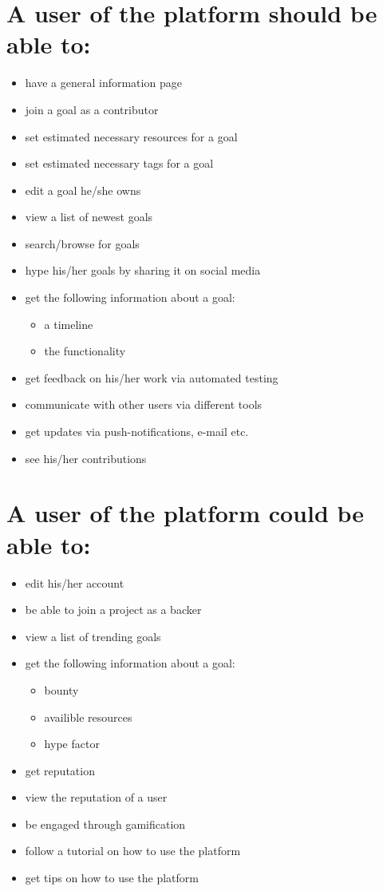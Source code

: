 \section*{A user of the platform should be able to:}
\begin{itemize}[nosep]
    \item have a general information page
    \item join a goal as a contributor
    \item set estimated necessary resources for a goal
    \item set estimated necessary tags for a goal
    \item edit a goal he/she owns
    \item view a list of newest goals
    \item search/browse for goals
    \item hype his/her goals by sharing it on social media
    \item get the following information about a goal:
        \begin{itemize}
            \item a timeline
            \item the functionality
        \end{itemize}
    \item get feedback on his/her work via automated testing
    \item communicate with other users via different tools 
    \item get updates via push-notifications, e-mail etc.
    \item see his/her contributions
\end{itemize}
\section*{A user of the platform could be able to:}
\begin{itemize}[nosep]
    \item edit his/her account
    \item be able to join a project as a backer
    \item view a list of trending goals
    \item get the following information about a goal:
        \begin{itemize}
            \item bounty
            \item availible resources
            \item hype factor
        \end{itemize}
    \item get reputation
    \item view the reputation of a user
    \item be engaged through gamification
    \item follow a tutorial on how to use the platform
    \item get tips on how to use the platform
\end{itemize}
